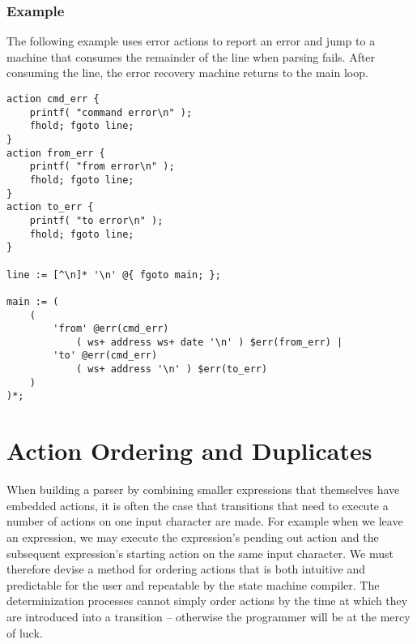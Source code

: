 \documentclass[letterpaper,11pt,oneside]{book}
\newenvironment{inline_code}{\def\baselinestretch{1}\vspace{12pt}\small}{}
\begin{document}
\begin{comment}
\begin{itemize}
\setlength{\parskip}{0in}
\item \verb|expr >^ (name, action) | -- Start state.
\item \verb|expr $^ (name, action) | -- All states.
\item \verb|expr %^ (name, action) | -- Final states.
\item \verb|expr <^ (name, action) | -- Not start state.
\item \verb|expr <>^ (name, action)| -- Not start and not final states.
\end{itemize}
\end{comment}

\subsubsection{Example}

The following example uses error actions to report an error and jump to a
machine that consumes the remainder of the line when parsing fails. After
consuming the line, the error recovery machine returns to the main loop.

\begin{inline_code}
\begin{verbatim}
action cmd_err { 
    printf( "command error\n" ); 
    fhold; fgoto line;
}
action from_err { 
    printf( "from error\n" ); 
    fhold; fgoto line; 
}
action to_err { 
    printf( "to error\n" ); 
    fhold; fgoto line;
}

line := [^\n]* '\n' @{ fgoto main; };

main := (
    (
        'from' @err(cmd_err) 
            ( ws+ address ws+ date '\n' ) $err(from_err) |
        'to' @err(cmd_err)
            ( ws+ address '\n' ) $err(to_err)
    ) 
)*;
\end{verbatim}
\end{inline_code}



\section{Action Ordering and Duplicates}

When building a parser by combining smaller expressions that themselves have
embedded actions, it is often the case that transitions that need to
execute a number of actions on one input character are made. For example when we leave
an expression, we may execute the expression's pending out action and the
subsequent expression's starting action on the same input character.  We must
therefore devise a method for ordering actions that is both intuitive and
predictable for the user and repeatable by the state machine compiler. The
determinization processes cannot simply order actions by the time at which they
are introduced into a transition -- otherwise the programmer will be at the
mercy of luck.
\end{document}

